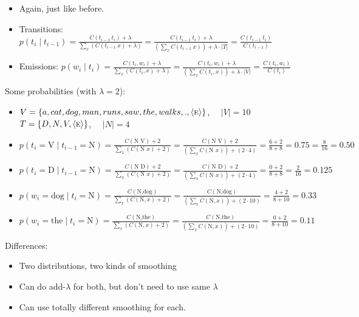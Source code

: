 \documentclass[11pt,letterpaper]{article}
\newcommand{\ngramend}{\ensuremath{\langle \textsc{e} \rangle}}
\begin{document}
\begin{itemize}
  \item Again, just like before.
  \item Transitions: $p(t_i \mid t_{i-1}) 
             = \frac{C(t_{i-1}~t_i)+\lambda}{\sum_x (C(t_{i-1}~x)+\lambda)} 
             = \frac{C(t_{i-1}~t_i)+\lambda}{(\sum_x C(t_{i-1}~x))+\lambda\cdot|T|} 
             = \frac{C(t_{i-1}~t_i)}{C(t_{i-1})}$
  \item Emissions: $p(w_i \mid t_i) 
             = \frac{C(t_i,w_i)+\lambda}{\sum_x (C(t_i,x)+\lambda)} 
             = \frac{C(t_i,w_i)+\lambda}{(\sum_x C(t_i,x))+\lambda\cdot|V|} 
             = \frac{C(t_i,w_i)}{C(t_i)}$
\end{itemize}

Some probabilities (with $\lambda=2$):

\begin{itemize}
  \item $V = \{ a, cat, dog, man, runs, saw, the, walks, ., \ngramend \}$, ~~$|V|=10$   \vspace{2mm} \\
        $T = \{ D, N, V, \ngramend \}$, ~~$|N|=4$
  \\
  \item $p(t_i=\text{V} \mid t_{i-1}=\text{N}) 
     = \frac{C(\text{N V})+2}{\sum_x (C(\text{N } x)+2)} 
     = \frac{C(\text{N V})+2}{(\sum_x C(\text{N } x))+(2 \cdot 4)} 
     = \frac{6+2}{8+8} = 0.75
     = \frac{8}{16} = 0.50$
  \item $p(t_i=\text{D} \mid t_{i-1}=\text{N}) 
     = \frac{C(\text{N D})+2}{\sum_x (C(\text{N } x)+2)} 
     = \frac{C(\text{N D})+2}{(\sum_x C(\text{N } x))+(2 \cdot 4)} 
     = \frac{0+2}{8+8}
     = \frac{2}{16} = 0.125$
  \\
  \item $p(w_i=\text{dog} \mid t_i=\text{N}) 
     = \frac{C(\text{N,dog})}{\sum_x (C(\text{N},x)+2)} 
     = \frac{C(\text{N,dog})}{(\sum_x C(\text{N},x))+(2 \cdot 10)} 
     = \frac{4+2}{8+10}
     = 0.33$
  \item $p(w_i=\text{the} \mid t_i=\text{N}) 
     = \frac{C(\text{N,the})}{\sum_x (C(\text{N},x)+2)} 
     = \frac{C(\text{N,the})}{(\sum_x C(\text{N},x))+(2 \cdot 10)} 
     = \frac{0+2}{8+10} 
     = 0.11$
\end{itemize}

Differences:

\begin{itemize}
  \item Two distributions, two kinds of smoothing
  \item Can do add-$\lambda$ for both, but don't need to use same $\lambda$
  \item Can use totally different smoothing for each.
\end{itemize}
\end{document}
